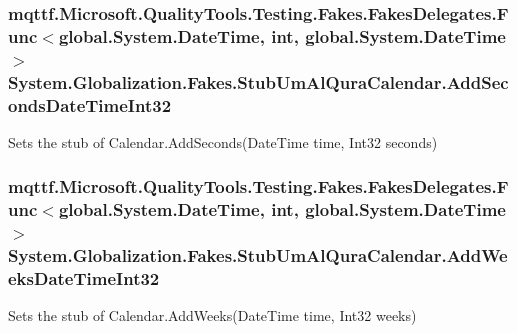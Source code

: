 \hypertarget{class_system_1_1_globalization_1_1_fakes_1_1_stub_um_al_qura_calendar_acbd707880be17a3e210f7b54fe1867a8}{
\subsubsection[{Add\-Seconds\-Date\-Time\-Int32}]{\setlength{\rightskip}{0pt plus 5cm}mqttf.\-Microsoft.\-Quality\-Tools.\-Testing.\-Fakes.\-Fakes\-Delegates.\-Func$<$global.\-System.\-Date\-Time, int, global.\-System.\-Date\-Time$>$ System.\-Globalization.\-Fakes.\-Stub\-Um\-Al\-Qura\-Calendar.\-Add\-Seconds\-Date\-Time\-Int32}}\label{class_system_1_1_globalization_1_1_fakes_1_1_stub_um_al_qura_calendar_acbd707880be17a3e210f7b54fe1867a8}


Sets the stub of Calendar.\-Add\-Seconds(\-Date\-Time time, Int32 seconds)

\hypertarget{class_system_1_1_globalization_1_1_fakes_1_1_stub_um_al_qura_calendar_a70f530bdf1ad8c9babd176c33907b055}{
\subsubsection[{Add\-Weeks\-Date\-Time\-Int32}]{\setlength{\rightskip}{0pt plus 5cm}mqttf.\-Microsoft.\-Quality\-Tools.\-Testing.\-Fakes.\-Fakes\-Delegates.\-Func$<$global.\-System.\-Date\-Time, int, global.\-System.\-Date\-Time$>$ System.\-Globalization.\-Fakes.\-Stub\-Um\-Al\-Qura\-Calendar.\-Add\-Weeks\-Date\-Time\-Int32}}\label{class_system_1_1_globalization_1_1_fakes_1_1_stub_um_al_qura_calendar_a70f530bdf1ad8c9babd176c33907b055}


Sets the stub of Calendar.\-Add\-Weeks(\-Date\-Time time, Int32 weeks)

